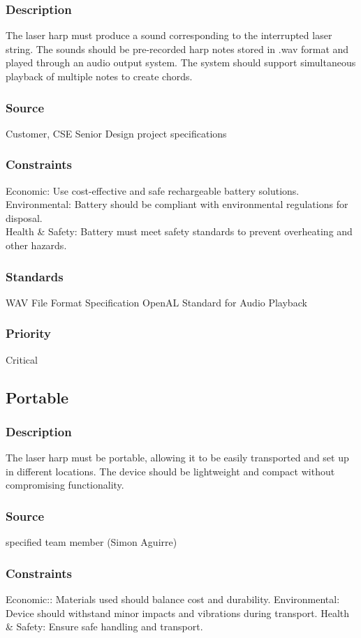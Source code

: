 \subsubsection{Description}
The laser harp must produce a sound corresponding to the interrupted laser string. The sounds should be pre-recorded harp notes stored in .wav format and played through an audio output system. The system should support simultaneous playback of multiple notes to create chords.
\subsubsection{Source}
Customer, CSE Senior Design project specifications
\subsubsection{Constraints}
Economic: Use cost-effective and safe rechargeable battery solutions.\\
Environmental: Battery should be compliant with environmental regulations for disposal.\\
Health \& Safety: Battery must meet safety standards to prevent overheating and other hazards.
\subsubsection{Standards}
WAV File Format Specification
OpenAL Standard for Audio Playback
\subsubsection{Priority}
Critical


\subsection{Portable}
\subsubsection{Description}
The laser harp must be portable, allowing it to be easily transported and set up in different locations. The device should be lightweight and compact without compromising functionality.
\subsubsection{Source}
specified team member (Simon Aguirre)
\subsubsection{Constraints}
Economic:: Materials used should balance cost and durability.
Environmental: Device should withstand minor impacts and vibrations during transport.
Health & Safety: Ensure safe handling and transport.
